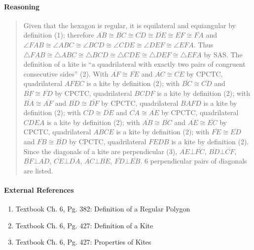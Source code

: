 \documentclass[letterpaper,12pt,twoside]{report}
\begin{document}
	\paragraph{Reasoning}
	\begin{quotation}
	
	Given that the hexagon is regular, it is equilateral and equiangular by definition (1); therefore $\overline{AB}\cong\overline{BC}\cong\overline{CD}\cong\overline{DE}\cong\overline{EF}\cong\overline{FA}$ and $\angle FAB\cong\angle ABC\cong\angle BCD\cong\angle CDE\cong\angle DEF\cong\angle EFA$. Thus $\triangle FAB\cong\triangle ABC\cong\triangle BCD\cong\triangle CDE\cong\triangle DEF\cong\triangle EFA$ by SAS. The definition of a kite is ``a quadrilateral with exactly two pairs of congruent consecutive sides'' (2). With $\overline{AF}\cong\overline{FE}$ and $\overline{AC}\cong\overline{CE}$ by CPCTC, quadrilateral $AFEC$ is a kite by definition (2); with $\overline{BC}\cong\overline{CD}$ and $\overline{BF}\cong\overline{FD}$ by CPCTC, quadrilateral $BCDF$ is a kite by definition (2); with $\overline{BA}\cong\overline{AF}$ and $\overline{BD}\cong\overline{DF}$ by CPCTC, quadrilateral $BAFD$ is a kite by definition (2); with $\overline{CD}\cong\overline{DE}$ and $\overline{CA}\cong\overline{AE}$ by CPCTC, quadrilateral $CDEA$ is a kite by definition (2); with $\overline{AB}\cong\overline{BC}$ and $\overline{AE}\cong\overline{EC}$ by CPCTC, quadrilateral $ABCE$ is a kite by definition (2); with $\overline{FE}\cong\overline{ED}$ and $\overline{FB}\cong\overline{BD}$ by CPCTC, quadrilateral $FEDB$ is a kite by definition (2). Since the diagonals of a kite are perpendicular (3), $\overline{AE}\bot\overline{FC}$, $\overline{BD}\bot\overline{CF}$, $\overline{BF}\bot\overline{AD}$, $\overline{CE}\bot\overline{DA}$, $\overline{AC}\bot\overline{BE}$, $\overline{FD}\bot\overline{EB}$. $\boxed{6}$ perpendicular pairs of diagonals are listed.
	
	\end{quotation}
	
	\paragraph{External References}
	
	\begin{enumerate}
		\item Textbook Ch. 6, Pg. 382: Definition of a Regular Polygon
		\item Textbook Ch. 6, Pg. 427: Definition of a Kite
		\item Textbook Ch. 6, Pg. 427: Properties of Kites
	\end{enumerate}
\end{document}
